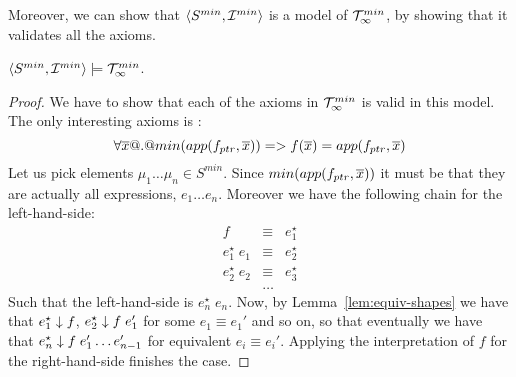 Moreover, we can show that $\langle S^{min},{\cal I}^{min}\rangle$ is a model of ${\cal T}_{\infty}^{min}$, by showing that
it validates all the axioms. 
\begin{theorem}
$\langle S^{min},{\cal I}^{min}\rangle \models {\cal T}_{\infty}^{min}$.
\end{theorem}
\begin{proof} We have to show that each of the axioms in ${\cal T}_{\infty}^{min}$ is valid in this model. The only interesting 
axioms is :
\[ \forall \overline{x} @.@ min(app(f_{ptr},\overline{x})) => f(\overline{x}) = app(f_{ptr},\overline{x}) \]
Let us pick elements $\mu_1\ldots\mu_n \in S^{min}$. Since $min(app(f_{ptr},\overline{x}))$ it must be that they are actually
all expressions, $e_1\ldots e_n$. Moreover we have the following chain for the left-hand-side: 
\[\begin{array}{lcl}
     f & \equiv & e_1^{\star} \\ 
     e^{\star}_1\;e_1 & \equiv & e^{\star}_2 \\ 
     e^{\star}_2\;e_2 & \equiv & e^{\star}_3 \\ 
              & \ldots & 
\end{array}\] 
Such that the left-hand-side is $e^{\star}_n\;e_n$. Now, by Lemma~\ref{lem:equiv-shapes} 
we have that $e^{\star}_1 \downarrow f$, $e^{\star}_2 \downarrow f\;e_1'$ for some $e_1 \equiv e_1'$ and so on, 
so that eventually we have that $e^{\star}_n \downarrow f\;e_1'\ldots e_{n-1}'$ for equivalent $e_i \equiv e_i'$. 
Applying the interpretation of $f$ for the right-hand-side finishes the case.
\end{proof} 
